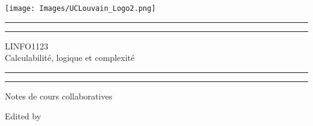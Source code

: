 \begin{titlepage} %

	\sffamily

   \hfill  \texttt{[image: Images/UCLouvain\_Logo2.png]}	
	
	\centering %
	
	
	\vspace*{3\baselineskip} %
	
	
	\rule{\textwidth}{1.6pt}\vspace*{-\baselineskip}\vspace*{2pt} %
	\rule{\textwidth}{0.4pt} %
	
	\vspace{0.75\baselineskip} %
	
	{\LARGE LINFO1123 \\ Calculabilité, logique et complexité \\} %
	
	\vspace{0.75\baselineskip} %
	
	\rule{\textwidth}{0.4pt}\vspace*{-\baselineskip}\vspace{3.2pt} %
	\rule{\textwidth}{1.6pt} %
	
	\vspace{2\baselineskip} %
	
	
	{\large   Notes de cours collaboratives } %
	
	\vspace*{3\baselineskip} %
	
	
	Edited by
	

\end{titlepage}
